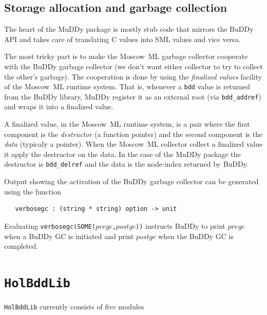 \documentclass[12pt,fleqn]{article}
\renewcommand{\t}[1]{\mbox{\tt #1}}
\newcommand{\mosml}{Moscow~ML{}}
\newcommand{\Buddy}{BuDDy{}}
\newcommand{\Muddy}{MuDDy{}}
\begin{document}
\subsection{Storage allocation and garbage collection}
\label{sec:technical-details}

The heart of the \Muddy{} package is mostly stub code that mirrors the
\Buddy{} API and takes care of translating C values into SML values and
vice versa.

The most tricky part is to make the \mosml{} garbage collector cooperate
with the \Buddy{} garbage collector (we don't want either collector to
try to collect the other's garbage).  The cooperation is done by using
the \emph{finalized values} facility of the \mosml{} runtime system.
That is, whenever a \texttt{bdd} value is returned from the \Buddy{}
library, \Muddy{} register it as an external root (via
\verb+bdd_addref+) and wraps it into a finalized value.  

A finalized value, in the \mosml{} runtime system, is a pair where the
first component is the \emph{destructor} (a function pointer) and the
second component is the \emph{data} (typicaly a pointer).  When the
\mosml{} collector collect a finalized value it apply the destructor on
the data.  In the case of the \Muddy{} package the destructor is
\verb+bdd_delref+ and the data is the node-index returned by \Buddy{}.

Output showing the activation of the \Buddy{} garbage collector can be generated
using the function

\begin{verbatim}
   verbosegc : (string * string) option -> unit
\end{verbatim}

Evaluating \t{verbosegc(SOME($pregc$,$postgc$))} instructs BuDDy to print
$pregc$ when a BuDDy GC is initiated and print $postgc$ when the
\Buddy{} GC is completed.

\section{\t{HolBddLib}}\label{HolBddLib}

\t{HolBddLib} currently consists of five modules
\end{document}
